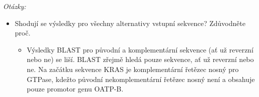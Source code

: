 \documentclass[11pt]{article}
\begin{document}
\emph{Otázky:}
\begin{itemize}
\item Shodují se výsledky pro všechny alternativy vstupní sekvence? Zdůvodněte proč.
\begin{itemize}
\item Výsledky BLAST pro původní a komplementární sekvence (ať už reverzní nebo
ne) se liší. BLAST zřejmě hledá pouze sekvence, ať už reverzní nebo ne. Na
začátku sekvence KRAS je komplementární řetězec nosný pro GTPase, kdežto
původní nekomplementární řetězec nosný není a obsahuje pouze promotor genu
OATP-B.
\end{itemize}
\end{itemize}
\end{document}
